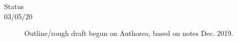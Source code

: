 \begin{description}
\item [{Status}]
\item [{03/05/20}] Outline/rough draft begun on Authorea, based on notes Dec. 2019.
\end{description}